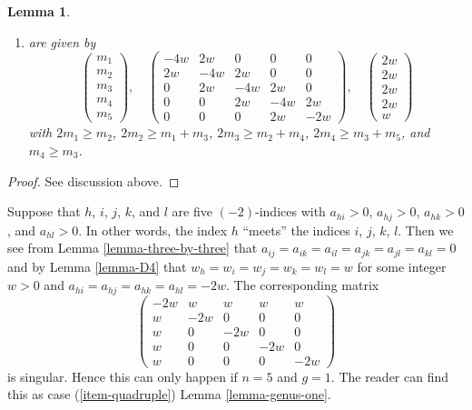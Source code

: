 \documentclass{stacks-project}
\theoremstyle{plain}
\newtheorem{lemma}[subsection]{Lemma}
\theoremstyle{definition}
\theoremstyle{remark}
\numberwithin{equation}{subsection}
\begin{document}
\begin{lemma}
\begin{enumerate}
$$\begin{matrix}
w \\
w \\
2w
\end{matrix}
\right)
$$
with $2m_1 \geq m_2$, $2m_2 \geq m_1 + m_3$, $2m_3 \geq m_2 + 2m_4$,
$2m_4 \geq m_3 + m_5$, and $2m_5 \geq m_4$, or
\item
\label{item-B5}
are given by
$$
\left(
\begin{matrix}
m_1 \\
m_2 \\
m_3 \\
m_4 \\
m_5
\end{matrix}
\right),
\quad
\left(
\begin{matrix}
-4w & 2w & 0 & 0 & 0 \\
2w & -4w & 2w & 0 & 0 \\
0 & 2w & -4w & 2w & 0 \\
0 & 0 & 2w & -4w & 2w \\
0 & 0 & 0 & 2w & -2w
\end{matrix}
\right),
\quad
\left(
\begin{matrix}
2w \\
2w \\
2w \\
2w \\
w
\end{matrix}
\right)
$$
with $2m_1 \geq m_2$, $2m_2 \geq m_1 + m_3$, $2m_3 \geq m_2 + m_4$,
$2m_4 \geq m_3 + m_5$, and $m_4 \geq m_3$.
\end{enumerate}
\end{lemma}

\begin{proof}
See discussion above.
\end{proof}

\noindent
Suppose that $h$, $i$, $j$, $k$, and $l$ are five $(-2)$-indices
with $a_{hi} > 0$, $a_{hj} > 0$, $a_{hk} > 0$, and $a_{hl} > 0$.
In other words, the index $h$ ``meets'' the indices
$i$, $j$, $k$, $l$. Then we see from Lemma \ref{lemma-three-by-three}
that $a_{ij} = a_{ik} = a_{il} = a_{jk} = a_{jl} = a_{kl} = 0$ and
by Lemma \ref{lemma-D4} that
$w_h = w_i = w_j = w_k = w_l = w$ for some integer $w > 0$ and
$a_{hi} = a_{hj} = a_{hk} = a_{hl} = -2w$.
The corresponding matrix
$$
\left(
\begin{matrix}
-2w & w & w & w & w \\
w & -2w & 0 & 0 & 0 \\
w & 0 & -2w & 0 & 0 \\
w & 0 & 0 & -2w & 0 \\
w & 0 & 0 & 0 & -2w
\end{matrix}
\right)
$$
is singular. Hence this can only happen if $n = 5$ and $g = 1$.
The reader can find this as case
(\ref{item-quadruple}) Lemma \ref{lemma-genus-one}.
\end{document}
